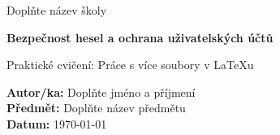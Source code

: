 \documentclass[12pt,a4paper]{article}
\newcommand{\nazevprace}{Bezpečnost hesel a ochrana uživatelských účtů}
\newcommand{\jmeno}{Doplňte jméno a příjmení}
\newcommand{\predmet}{Doplňte název předmětu}
\newcommand{\skola}{Doplňte název školy}
\newcommand{\datumodevzdani}{\today}
\begin{document}
\begin{titlepage}
    \centering
    {\large \skola\par}
    \vspace{3cm}
    {\LARGE\bfseries \nazevprace\par}
    \vspace{2cm}
    {\large Praktické cvičení: Práce s více soubory v LaTeXu\par}
    \vfill
    \begin{flushleft}
        \textbf{Autor/ka:} \jmeno\\[0.5em]
        \textbf{Předmět:} \predmet\\[0.5em]
        \textbf{Datum:} \datumodevzdani
    \end{flushleft}
    \vspace{1cm}
\end{titlepage}

\tableofcontents
\newpage



\newpage

\end{document}
